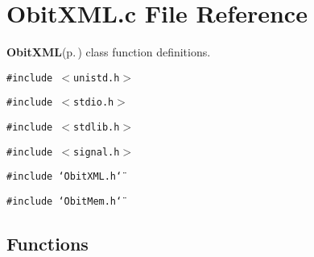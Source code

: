 \section{Obit\-XML.c File Reference}
\label{ObitXML_8c}
{\bf Obit\-XML}{\rm (p.\,\pageref{structObitXML})} class function definitions. 

{\tt \#include $<$unistd.h$>$}\par
{\tt \#include $<$stdio.h$>$}\par
{\tt \#include $<$stdlib.h$>$}\par
{\tt \#include $<$signal.h$>$}\par
{\tt \#include \char`\"{}Obit\-XML.h\char`\"{}}\par
{\tt \#include \char`\"{}Obit\-Mem.h\char`\"{}}\par
\subsection*{Functions}
